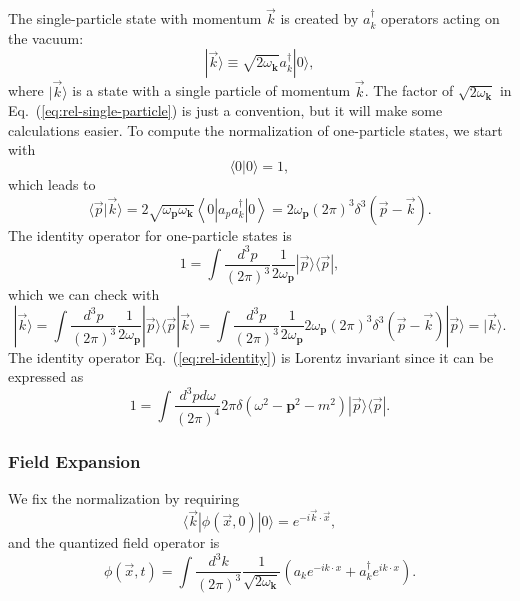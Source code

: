 The single-particle state with momentum $\vec k$ is created by $a_{k}^{\dagger}$ operators acting on the vacuum:
\begin{equation}
	|\vec{k}\rangle \equiv \sqrt{2\omega_{\bm k}} a_{k}^{\dagger}|0\rangle,
	\label{eq:rel-single-particle}
\end{equation}
where $|\vec{k}\rangle$ is a state with a single particle of momentum $\vec{k}$.
The factor of $\sqrt{2 \omega_{\bm k}}$ in Eq.~(\ref{eq:rel-single-particle}) is just a convention, but it will make some calculations easier. 
To compute the normalization of one-particle states, we start with
\begin{equation}
	\langle 0|0\rangle=1,
\end{equation}
which leads to
\begin{equation}
	\langle\vec{p}|\vec{k}\rangle 
	= 2\sqrt{\omega_{\bm p} \omega_{\bm k}}\left\langle 0\left|a_{p} a_{k}^{\dagger}\right| 0\right\rangle
	= 2 \omega_{\bm p}(2\pi)^{3} \delta^{3}(\vec{p}-\vec{k}).
\end{equation}
The identity operator for one-particle states is
\begin{equation}
	1=\int \frac{d^{3} p}{(2\pi)^{3}} \frac{1}{2\omega_{\bm p}}|\vec{p}\rangle\langle\vec{p}|, \label{eq:rel-identity}
\end{equation}
which we can check with
\begin{equation*}
	|\vec{k}\rangle
	=\int \frac{d^{3} p}{(2\pi)^{3}} \frac{1}{2\omega_{\bm p}}|\vec{p}\rangle\langle\vec{p}|\vec{k}\rangle
	=\int \frac{d^{3} p}{(2\pi)^{3}} \frac{1}{2\omega_{\bm p}} 2\omega_{\bm p}(2\pi)^3 \delta^3(\vec{p}-\vec{k})|\vec{p}\rangle
	=|\vec{k}\rangle.
\end{equation*}
The identity operator Eq.~(\ref{eq:rel-identity}) is Lorentz invariant since it can be expressed as
\begin{equation}
	1 = \int \frac{d^{3} p d\omega}{(2\pi)^{4}} 2\pi\delta(\omega^2-{\bm{p}}^2-m^2) |\vec p\rangle\langle \vec p|.
\end{equation}

\subsubsection{Field Expansion}
We fix the normalization by requiring 
\begin{equation}
	\langle \vec k|\phi(\vec x,0)|0\rangle = e^{-i \vec k\cdot \vec x},
\end{equation}
and the quantized field operator is
\begin{equation}
	\phi(\vec{x}, t)
	=\int \frac{d^{3} k}{(2\pi)^{3}} \frac{1}{\sqrt{2\omega_{\bm k}}}\left(a_k 
	e^{-i k \cdot x}+a_k^{\dagger} e^{i k \cdot x}\right).
\end{equation}

